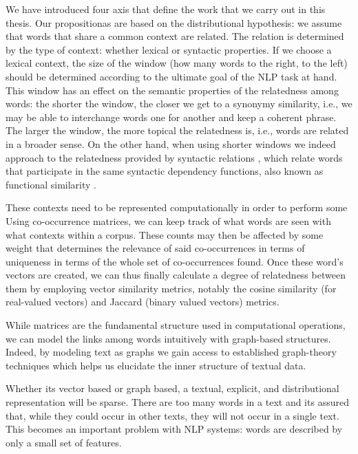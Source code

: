 We have introduced four axis that define the work that we carry out in this thesis. Our propositionas are based on the distributional hypothesis: we assume that words that share a common context are related. The relation is determined by the type of context: whether lexical or syntactic properties. If we choose a lexical context, the size of the window (how many words to the right, to the left) should be determined according to the ultimate goal of the NLP task at hand. This window has an effect on the semantic properties of the relatedness among words: the shorter the window, the closer we get to a synonymy similarity, i.e., we may be able to interchange words one for another and keep a coherent phrase. The larger the window, the more topical the relatedness is, i.e., words are related in a broader sense. On the other hand, when using shorter windows we indeed approach to the relatedness provided by syntactic relations \cite{sahlgren2006word}, which relate words that participate in the same syntactic dependency functions, also known as functional similarity \cite{LevyG14}. %

These contexts need to be represented computationally in order to perform some Using co-occurrence matrices, we can keep track of what words are seen with what contexts within a corpus. These counts may then be affected by some weight that determines the relevance of said co-occurrences in terms of uniqueness in terms of the whole set of co-occurrences found. Once these word's vectors are created, we can thus finally calculate a degree of relatedness between them by employing vector similarity metrics, notably the cosine similarity (for real-valued vectors) and Jaccard (binary valued vectors) metrics.

While matrices are the fundamental structure used in computational operations, we can model the links among words intuitively with graph-based structures. Indeed, by modeling text as graphs we gain access to  established graph-theory techniques which helps us elucidate the inner structure of textual data. 	

Whether its vector based or graph based, a textual, explicit, and distributional representation will be sparse. There are too many words in a text and its assured that, while they could occur in other texts, they will not occur in a single text. This becomes an important problem with NLP systems: words are described by only a small set of features.

